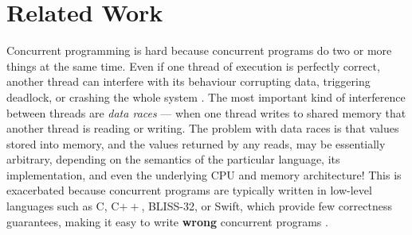 \section{Related Work}
	



Concurrent programming is hard \cite{lea98,concurrentHard}
%
%
%
because concurrent programs do two or more things at the same
time. Even if one thread of execution is perfectly correct, another
thread can interfere with its behaviour corrupting data, triggering
deadlock, or crashing the whole system \cite{fonesca2010}.
%
%
The most important kind of interference between threads are
\textit{data races} --- when one thread writes to shared memory that
another thread is reading or writing. The problem with data races is
that values stored into memory, and the values returned by any reads,
may be essentially arbitrary, depending on the semantics of the
particular language, its implementation, and even the underlying CPU
and memory architecture!
%
%
%
%
%
This is exacerbated because concurrent programs are typically written in low-level languages
such as C, C$++$, BLISS-32, or Swift, which provide
few correctness guarantees, making it easy to write \textbf{wrong}
concurrent programs
\cite{CCppSCAM2014,LuSurvey2008}.
%
%
%
%
%

